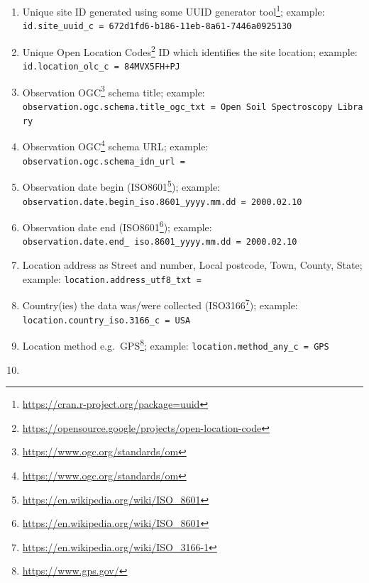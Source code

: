 \documentclass[
  graybox,natbib,nospthms]{svmono}
\providecommand{\tightlist}{%
  \setlength{\itemsep}{0pt}\setlength{\parskip}{0pt}}
\providecommand{\tightlist}{\setlength{\itemsep}{0pt}\setlength{\parskip}{0pt}}
\renewcommand{\href}[2]{#2 (\url{#1})}
\renewcommand{\href}[2]{#2\footnote{\url{#1}}}
\begin{document}
\begin{enumerate}
\def\labelenumi{\arabic{enumi}.}
\tightlist
\item
  Unique site ID generated using some \href{https://cran.r-project.org/package=uuid}{UUID generator tool}; example: \texttt{id.site\_uuid\_c\ =\ \textquotesingle{}672d1fd6-b186-11eb-8a61-7446a0925130\textquotesingle{}}\\
\item
  Unique \href{https://opensource.google/projects/open-location-code}{Open Location Codes} ID which identifies the site location; example: \texttt{id.location\_olc\_c\ =\ \textquotesingle{}84MVX5FH+PJ\textquotesingle{}}\\
\item
  \href{https://www.ogc.org/standards/om}{Observation OGC} schema title; example: \texttt{observation.ogc.schema.title\_ogc\_txt\ =\ \textquotesingle{}Open\ Soil\ Spectroscopy\ Library\textquotesingle{}}\\
\item
  \href{https://www.ogc.org/standards/om}{Observation OGC} schema URL; example: \texttt{observation.ogc.schema\_idn\_url\ =\ \textquotesingle{}\textquotesingle{}}\\
\item
  Observation date begin (\href{https://en.wikipedia.org/wiki/ISO_8601}{ISO8601}); example: \texttt{observation.date.begin\_iso.8601\_yyyy.mm.dd\ =\ \textquotesingle{}2000.02.10\textquotesingle{}}\\
\item
  Observation date end (\href{https://en.wikipedia.org/wiki/ISO_8601}{ISO8601}); example: \texttt{observation.date.end\_\ iso.8601\_yyyy.mm.dd\ =\ \textquotesingle{}2000.02.10\textquotesingle{}}\\
\item
  Location address as Street and number, Local postcode, Town, County, State; example: \texttt{location.address\_utf8\_txt\ =\ \textquotesingle{}\textquotesingle{}}\\
\item
  Country(ies) the data was/were collected (\href{https://en.wikipedia.org/wiki/ISO_3166-1}{ISO3166}); example: \texttt{location.country\_iso.3166\_c\ =\ \textquotesingle{}USA\textquotesingle{}}\\
\item
  Location method e.g.~\href{https://www.gps.gov/}{GPS}; example: \texttt{location.method\_any\_c\ =\ \textquotesingle{}GPS\textquotesingle{}}\\
\item

\end{enumerate}
\end{document}
